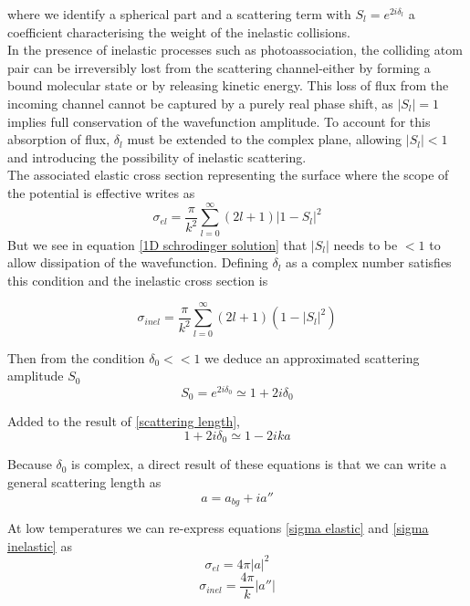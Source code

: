 where we identify a spherical part and a scattering term with $S_l = e^{2i\delta_l}$ a coefficient characterising the weight of the inelastic collisions.\\

In the presence of inelastic processes such as photoassociation, the colliding atom pair can be irreversibly lost
from the scattering channel-either by forming a bound molecular
state or by releasing kinetic energy. This loss of flux from the
incoming channel cannot be captured by a purely real phase shift,
as $|S_l|= 1$ implies full conservation of the wavefunction
amplitude. To account for this absorption of flux, $\delta_l$
must be extended to the complex plane, allowing $|S_l| < 1$
and introducing the possibility of inelastic scattering.\\

The associated elastic cross section representing the surface where the scope
of the potential is effective writes as
\begin{equation}
    \sigma_{el} = \frac{\pi}{k^2}\sum_{l=0}^{\infty}(2l+1)|1-S_l|^2
    \label{sigma elastic}
\end{equation}
But we see in equation \ref{1D schrodinger solution} that $|S_l|$ needs to be $<1$ to allow dissipation of the
wavefunction. Defining $\delta_l$ as a complex number satisfies this condition and the inelastic cross section
is

\begin{equation}
    \sigma_{inel} = \frac{\pi}{k^2}\sum_{l=0}^{\infty}(2l+1)(1-|S_l|^2)
    \label{sigma inelastic}
\end{equation}


Then from the condition $\delta_0 << 1$ we deduce an approximated scattering amplitude $S_0$
\begin{equation}
    S_0 = e^{2i\delta_0} \simeq 1 + 2i\delta_0
\end{equation}

Added to the result of \ref{scattering length},
\begin{equation}
     1 + 2i\delta_0 \simeq 1 - 2ika
\end{equation}

Because $\delta_0$ is complex, a direct result of these equations is that we can write a general scattering length as
\begin{equation}
    a = a_{bg} + i a''
\end{equation}

At low temperatures we can re-express equations \ref{sigma elastic} and \ref{sigma inelastic} as
\begin{equation}
    \sigma_{el} = 4\pi|a|^2
\end{equation}
\begin{equation}
    \sigma_{inel} = \frac{4\pi}{k}|a''|
\end{equation}

